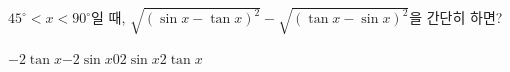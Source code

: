 $45^\circ<x<90^\circ$일 때, $\sqrt{(\sin x-\tan x)^2}-\sqrt{(\tan x-\sin x)^2}$을 간단히 하면?
\begin{choices32}{$-2\tan x$}{$-2\sin x$}{$0$}{$2\sin x$}{$2\tan x$}\end{choices32}

